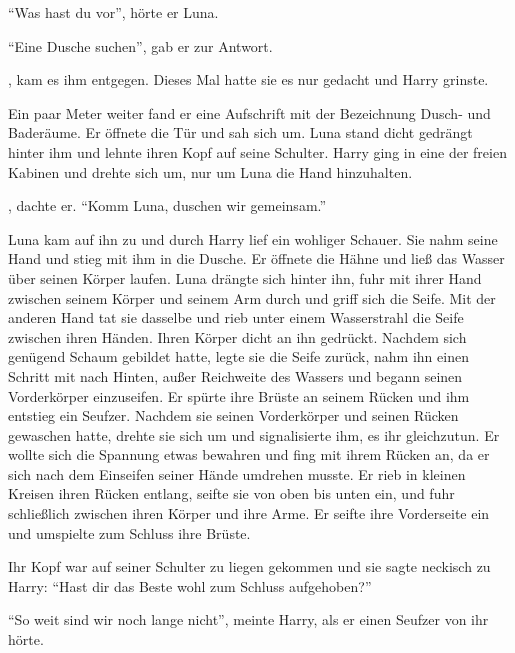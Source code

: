 \enquote{Was hast du vor}, hörte er Luna.

\enquote{Eine Dusche suchen}, gab er zur Antwort.

, kam es ihm entgegen. Dieses Mal hatte sie es nur ge\-dacht und Harry grins\-te.

Ein paar Meter weiter fand er eine Aufschrift mit der Bezeichnung Dusch- und Baderäume. Er öffnete die Tür und sah sich um. Luna stand dicht gedrängt hinter ihm und lehnte ihren Kopf auf seine Schulter. Harry ging in eine der freien Kabinen und drehte sich um, nur um Luna die Hand hinzuhalten.

, dachte er. \enquote{Komm Luna, duschen wir gemeinsam.}

Luna kam auf ihn zu und durch Harry lief ein wohliger Schauer. Sie nahm seine Hand und stieg mit ihm in die Dusche. Er öffnete die Hähne und ließ das Wasser über seinen Körper laufen. Luna drängte sich hinter ihn, fuhr mit ihrer Hand zwischen seinem Körper und seinem Arm durch und griff sich die Seife. Mit der anderen Hand tat sie dasselbe und rieb unter einem Wasserstrahl die Seife zwischen ihren Händen. Ihren Körper dicht an ihn gedrückt. Nachdem sich genügend Schaum gebildet hatte, legte sie die Seife zurück, nahm ihn einen Schritt mit nach Hinten, außer Reichweite des Wassers und begann seinen Vorderkörper einzuseifen. Er spürte ihre Brüste an seinem Rücken und ihm entstieg ein Seufzer. Nachdem sie seinen Vorderkörper und seinen Rücken gewaschen hatte, drehte sie sich um und signalisierte ihm, es ihr gleichzutun. Er wollte sich die Spannung etwas bewahren und fing mit ihrem Rücken an, da er sich nach dem Einseifen seiner Hände umdrehen musste. Er rieb in kleinen Kreisen ihren Rücken entlang, seifte sie von oben bis unten ein, und fuhr schließlich zwischen ihren Körper und ihre Arme. Er seifte ihre Vorderseite ein und umspielte zum Schluss ihre Brüste.

Ihr Kopf war auf seiner Schulter zu liegen gekommen und sie sagte neckisch zu Harry: \enquote{Hast dir das Beste wohl zum Schluss aufgehoben?}

\enquote{So weit sind wir noch lange nicht}, meinte Harry, als er einen Seufzer von ihr hörte.

